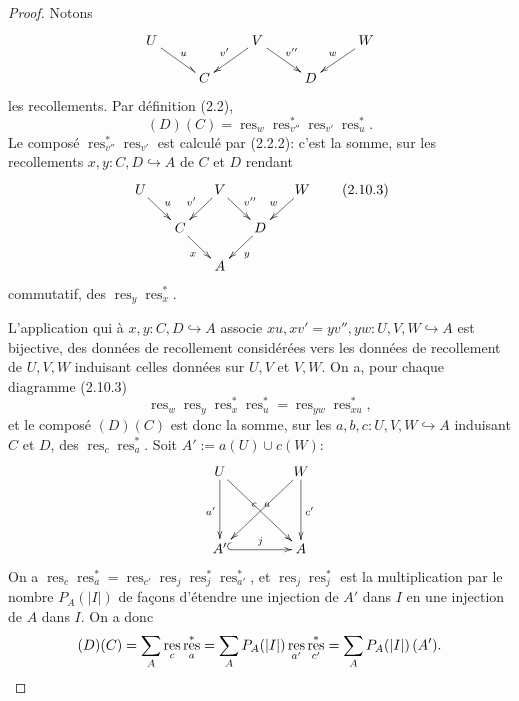 \documentclass[11pt,a4paper]{article}
\theoremstyle{plain}
\theoremstyle{definition}
\DeclareMathOperator{\res}{res}
\newcommand{\inj}{\hookrightarrow}
\begin{document}
\begin{proof}
Notons
\[
\xymatrix@R=1.2pc{
U \ar@^{->}[dr]^{u} & & V \ar[dl]_{v'} \ar[dr]^{v''} & & W \ar[dl]_{w} \\
& C & & D
}
\]
les recollements. Par d\'efinition (2.2),
\[
(D)(C) = \res_w \res^*_{v''} \res_{v'} \res^*_u.
\]
Le compos\'e $\res^*_{v''} \res_{v'}$ est calcul\'e par (2.2.2): c'est la somme, sur les recollements $x, y : C, D \inj A$ de $C$ et $D$ rendant
\begin{equation}
\xymatrix@R=1.2pc@C=1.2pc{
U \ar[dr]^{u} & & V \ar[dl]_{v'} \ar[dr]^{v''} & & W \ar[dl]_{w} \\
& C \ar[dr]_{x} & & D \ar[dl]^{y} & \\
& & A
} \tag{2.10.3}
\end{equation}
commutatif, des $\res_y \res^*_x$.

L'application qui \`a $x, y : C, D \inj A$ associe $xu, xv' = yv'', yw : U, V, W \inj A$ est bijective, des donn\'ees de recollement consid\'er\'ees vers les donn\'ees de recollement de $U, V, W$ induisant celles donn\'ees sur $U, V$ et $V, W$. On a, pour chaque diagramme (2.10.3)
\[
\res_w \res_y \res^*_x \res^*_u = \res_{yw} \res^*_{xu},
\]
et le compos\'e $(D)(C)$ est donc la somme, sur les $a, b, c : U, V, W \inj A$ induisant $C$ et $D$, des $\res_c \res^*_a$. Soit $A' := a(U) \cup c(W)$:
\[
\xymatrix@R=1.5pc@C=1.5pc{
U \ar[dd]_{a'} \ar[ddrr]^{a} & & W \ar[dd]^{c'} \ar[ddll]_{c} \\
& & \\
A' \ar@{^{(}->}[rr]^{j} & & A
}
\]
On a $\res_c \res^*_a = \res_{c'} \res_j \res^*_j \res^*_{a'}$, et $\res_j \res^*_j$ est la multiplication par le nombre $P_A(|I|)$ de fa\c{c}ons d'\'etendre une injection de $A'$ dans $I$ en une injection de $A$ dans $I$. On a donc
\[
(D)(C) = \sum_A \res_c \res^*_a = \sum_A P_A(|I|) \res_{a'} \res^*_{c'} = \sum_A P_A(|I|)\,(A'). \qedhere
\]
\end{proof}
\end{document}
